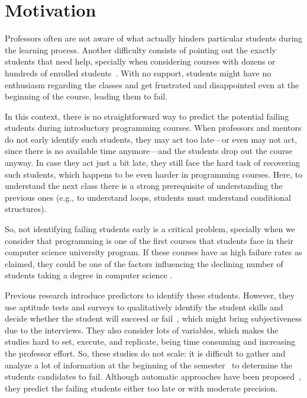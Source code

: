 \section{Motivation}

\label{sec:problem}

Professors often are not aware of what actually hinders particular students during the learning process. Another difficulty consists of pointing out the exactly students that need help, specially when considering courses with dozens or hundreds of enrolled students~\cite{bennedsen-sigcse-failure-rates-2007}. With no support, students might have no enthusiasm regarding the classes and get frustrated and disappointed even at the beginning of the course, leading them to fail.

In this context, there is no straightforward way to predict the potential failing students during introductory programming courses. When professors and mentors do not early identify such students, they may act too late---or even may not act, since there is no available time anymore---and the students drop out the course anyway. In case they act just a bit late, they still face the hard task of recovering such students, which happens to be even harder in programming courses. Here, to understand the next class there is a strong prerequisite of understanding the previous ones (e.g., to understand loops, students must understand conditional structures).

So, not identifying failing students early is a critical problem, specially when we consider that programming is one of the first courses that students face in their computer science university program. If these courses have as high failure rates as claimed, they could be one of the factors influencing the declining number of students taking a degree in computer science \cite{bennedsen-sigcse-failure-rates-2007}.

Previous research introduce predictors to identify these students. However, they use aptitude tests and surveys to qualitatively identify the student skills and decide whether the student will succeed or fail~\cite{butcher-predictor-high-school-1985, simon-predictors-ace2006, camel-2006}, which might bring subjectiveness due to the interviews. They also consider lots of variables, which makes the studies hard to set, execute, and replicate, being time consuming and increasing the professor effort. So, these studies do not scale: it is difficult to gather and analyze a lot of information at the beginning of the semester~\cite{harris-assembly-jcsc2014} to determine the students candidates to fail. Although automatic approaches have been proposed~\cite{watson-icalt-2013, emily-icer-2011}, they predict the failing students either too late or with moderate precision.

